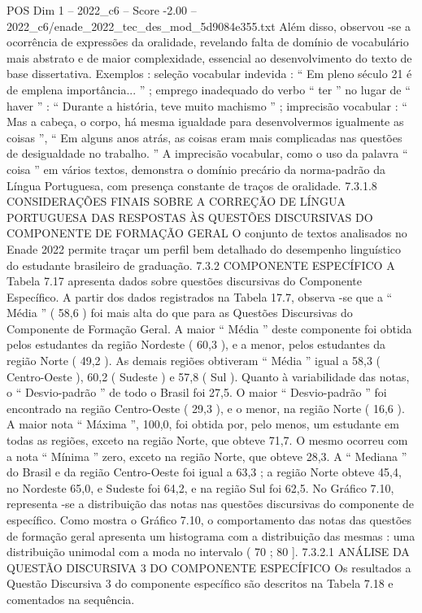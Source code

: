 \begin{textsample}{POS Dim 1 – 2022\_c6 – Score -2.00 – 2022\_c6/enade\_2022\_tec\_des\_mod\_5d9084e355.txt}
Além disso, observou -se a ocorrência de expressões da oralidade, revelando falta de domínio de vocabulário mais abstrato e de maior complexidade, essencial ao desenvolvimento do texto de base dissertativa.
Exemplos : seleção vocabular indevida : “ Em pleno século 21 é de emplena importância... ” ; emprego inadequado do verbo “ ter ” no lugar de “ haver ” : “ Durante a história, teve muito machismo ” ; imprecisão vocabular : “ Mas a cabeça, o corpo, há mesma igualdade para desenvolvermos igualmente as coisas ”, “ Em alguns anos atrás, as coisas eram mais complicadas nas questões de desigualdade no trabalho. ” A imprecisão vocabular, como o uso da palavra “ coisa ” em vários textos, demonstra o domínio precário da norma-padrão da Língua Portuguesa, com presença constante de traços de oralidade. 7.3.1.8 CONSIDERAÇÕES FINAIS SOBRE A CORREÇÃO DE LÍNGUA PORTUGUESA DAS RESPOSTAS ÀS QUESTÕES DISCURSIVAS DO COMPONENTE DE FORMAÇÃO GERAL O conjunto de textos analisados no Enade 2022 permite traçar um perfil bem detalhado do desempenho linguístico do estudante brasileiro de graduação. 7.3.2 COMPONENTE ESPECÍFICO A Tabela 7.17 apresenta dados sobre questões discursivas do Componente Específico.
A partir dos dados registrados na Tabela 17.7, observa -se que a “ Média ” ( 58,6 ) foi mais alta do que para as Questões Discursivas do Componente de Formação Geral.
A maior “ Média ” deste componente foi obtida pelos estudantes da região Nordeste ( 60,3 ), e a menor, pelos estudantes da região Norte ( 49,2 ).
As demais regiões obtiveram “ Média ” igual a 58,3 ( Centro-Oeste ), 60,2 ( Sudeste ) e 57,8 ( Sul ).
Quanto à variabilidade das notas, o “ Desvio-padrão ” de todo o Brasil foi 27,5.
O maior “ Desvio-padrão ” foi encontrado na região Centro-Oeste ( 29,3 ), e o menor, na região Norte ( 16,6 ).
A maior nota “ Máxima ”, 100,0, foi obtida por, pelo menos, um estudante em todas as regiões, exceto na região Norte, que obteve 71,7.
O mesmo ocorreu com a nota “ Mínima ” zero, exceto na região Norte, que obteve 28,3.
A “ Mediana ” do Brasil e da região Centro-Oeste foi igual a 63,3 ; a região Norte obteve 45,4, no Nordeste 65,0, e Sudeste foi 64,2, e na região Sul foi 62,5.
No Gráfico 7.10, representa -se a distribuição das notas nas questões discursivas do componente de específico.
Como mostra o Gráfico 7.10, o comportamento das notas das questões de formação geral apresenta um histograma com a distribuição das mesmas : uma distribuição unimodal com a moda no intervalo ( 70 ; 80 ]. 7.3.2.1 ANÁLISE DA QUESTÃO DISCURSIVA 3 DO COMPONENTE ESPECÍFICO Os resultados a Questão Discursiva 3 do componente específico são descritos na Tabela 7.18 e comentados na sequência.

\end{textsample}
